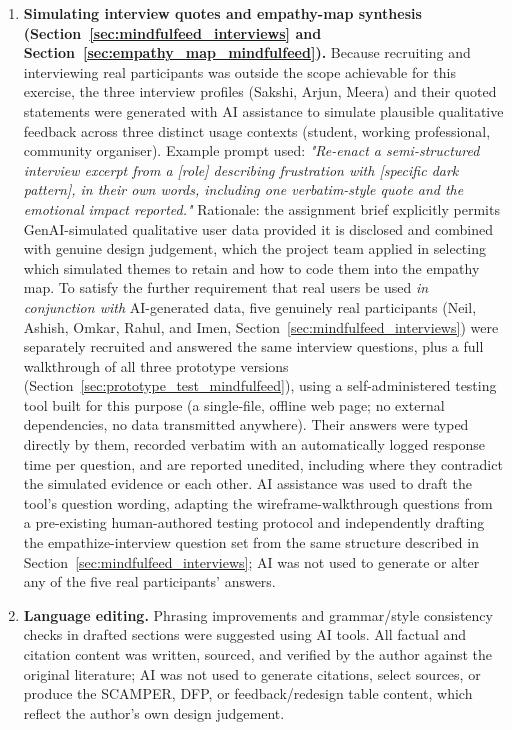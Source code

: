 \documentclass[11pt]{article}
\begin{document}
\begin{enumerate}
\item \textbf{Simulating interview quotes and empathy-map synthesis (Section~\ref{sec:mindfulfeed_interviews} and Section~\ref{sec:empathy_map_mindfulfeed}).} Because recruiting and interviewing real participants was outside the scope achievable for this exercise, the three interview profiles (Sakshi, Arjun, Meera) and their quoted statements were generated with AI assistance to simulate plausible qualitative feedback across three distinct usage contexts (student, working professional, community organiser). Example prompt used: \textit{"Re-enact a semi-structured interview excerpt from a [role] describing frustration with [specific dark pattern], in their own words, including one verbatim-style quote and the emotional impact reported."} Rationale: the assignment brief explicitly permits GenAI-simulated qualitative user data provided it is disclosed and combined with genuine design judgement, which the project team applied in selecting which simulated themes to retain and how to code them into the empathy map. To satisfy the further requirement that real users be used \textit{in conjunction with} AI-generated data, five genuinely real participants (Neil, Ashish, Omkar, Rahul, and Imen, Section~\ref{sec:mindfulfeed_interviews}) were separately recruited and answered the same interview questions, plus a full walkthrough of all three prototype versions (Section~\ref{sec:prototype_test_mindfulfeed}), using a self-administered testing tool built for this purpose (a single-file, offline web page; no external dependencies, no data transmitted anywhere). Their answers were typed directly by them, recorded verbatim with an automatically logged response time per question, and are reported unedited, including where they contradict the simulated evidence or each other. AI assistance was used to draft the tool's question wording, adapting the wireframe-walkthrough questions from a pre-existing human-authored testing protocol and independently drafting the empathize-interview question set from the same structure described in Section~\ref{sec:mindfulfeed_interviews}; AI was not used to generate or alter any of the five real participants' answers.
\item \textbf{Language editing.} Phrasing improvements and grammar/style consistency checks in drafted sections were suggested using AI tools. All factual and citation content was written, sourced, and verified by the author against the original literature; AI was not used to generate citations, select sources, or produce the SCAMPER, DFP, or feedback/redesign table content, which reflect the author's own design judgement.

\end{enumerate}
\end{document}

